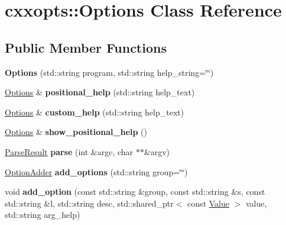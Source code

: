 \hypertarget{classcxxopts_1_1Options}{}\section{cxxopts\+:\+:Options Class Reference}
\label{classcxxopts_1_1Options}
\subsection*{Public Member Functions}
\begin{DoxyCompactItemize}
\item 
{\bfseries Options} (std\+::string program, std\+::string help\+\_\+string=\char`\"{}\char`\"{})\hypertarget{classcxxopts_1_1Options_ab73d569871f0a8ae1ba9be77397fab5e}{}\label{classcxxopts_1_1Options_ab73d569871f0a8ae1ba9be77397fab5e}

\item 
\hyperlink{classcxxopts_1_1Options}{Options} \& {\bfseries positional\+\_\+help} (std\+::string help\+\_\+text)\hypertarget{classcxxopts_1_1Options_aae2dd95b1726d4889f93ef0936eb3b5b}{}\label{classcxxopts_1_1Options_aae2dd95b1726d4889f93ef0936eb3b5b}

\item 
\hyperlink{classcxxopts_1_1Options}{Options} \& {\bfseries custom\+\_\+help} (std\+::string help\+\_\+text)\hypertarget{classcxxopts_1_1Options_acd1dc7d2032955d657b4cb8d0ba37e37}{}\label{classcxxopts_1_1Options_acd1dc7d2032955d657b4cb8d0ba37e37}

\item 
\hyperlink{classcxxopts_1_1Options}{Options} \& {\bfseries show\+\_\+positional\+\_\+help} ()\hypertarget{classcxxopts_1_1Options_a23772aa39f437ca9b47adf77c20f88ff}{}\label{classcxxopts_1_1Options_a23772aa39f437ca9b47adf77c20f88ff}

\item 
\hyperlink{classcxxopts_1_1ParseResult}{Parse\+Result} {\bfseries parse} (int \&argc, char $\ast$$\ast$\&argv)\hypertarget{classcxxopts_1_1Options_a5644fb98fb9dfe8237b1a5db83883c96}{}\label{classcxxopts_1_1Options_a5644fb98fb9dfe8237b1a5db83883c96}

\item 
\hyperlink{classcxxopts_1_1OptionAdder}{Option\+Adder} {\bfseries add\+\_\+options} (std\+::string group=\char`\"{}\char`\"{})\hypertarget{classcxxopts_1_1Options_a8c4fcf551295cde940a1a60012b3e9b6}{}\label{classcxxopts_1_1Options_a8c4fcf551295cde940a1a60012b3e9b6}

\item 
void {\bfseries add\+\_\+option} (const std\+::string \&group, const std\+::string \&s, const std\+::string \&l, std\+::string desc, std\+::shared\+\_\+ptr$<$ const \hyperlink{classcxxopts_1_1Value}{Value} $>$ value, std\+::string arg\+\_\+help)\hypertarget{classcxxopts_1_1Options_aa2d4a543101e74bed7f7b8c1caa80928}{}\label{classcxxopts_1_1Options_aa2d4a543101e74bed7f7b8c1caa80928}


\end{DoxyCompactItemize}
